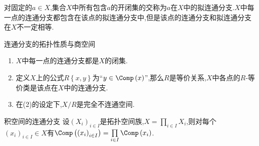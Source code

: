 \begin{remark}{}{}
	对固定的$a\in X$,集合$X$中所有包含$a$的开闭集的交称为$a$在$X$中的拟连通分支.$X$中每一点的连通分支都包含在该点的拟连通分支中,但是该点的连通分支和拟连通分支在$X$不一定相等.
\end{remark}

\begin{proposition}{连通分支的拓扑性质与商空间}{}
	\begin{enumerate}
		\item $X$中每一点的连通分支都是$X$的闭集.
		\item 定义$X$上的公式$R\left\{x,y\right\}$为``$y\in\Comp\left(x\right)$'',那么$R$是等价关系,$X$中各点的$R$-等价类是该点在$X$中的连通分支.
		\item 在(2)的设定下,$X/R$是完全不连通空间.
	\end{enumerate}
\end{proposition}

\begin{proposition}{积空间的连通分支}{}
	设$\left(X_{i}\right)_{i\in I}$是拓扑空间族,$X=\prod\limits_{i\in I}X_{i}$,则对每个$\left(x_{i}\right)_{i\in I}\in X$有$\Comp\left(\left(x_{i}\right)_{i\in I}\right)=\prod\limits_{i\in I}\Comp\left(x_{i}\right)$.
\end{proposition}
